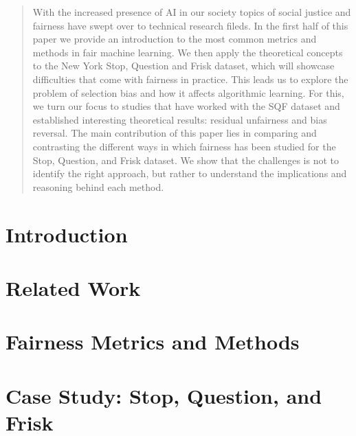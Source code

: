 \documentclass[12pt]{article}
\begin{document}
\newpage
\begin{abstract}

With the increased presence of AI in our society topics of social justice and fairness have swept over to technical research fileds. In the first half of this paper we provide an introduction to the most common metrics and methods in fair machine learning. We then apply the theoretical concepts to the New York Stop, Question and Frisk dataset, which will showcase difficulties that come with fairness in practice.
This leads us to explore the problem of selection bias and how it affects algorithmic learning. For this, we turn our focus to studies that have worked with the SQF dataset and established interesting theoretical results: residual unfairness and bias reversal.
The main contribution of this paper lies in comparing and contrasting the different ways in which fairness has been studied for the Stop, Question, and Frisk dataset. We show that the challenges is not to identify the right approach, but rather to understand the implications and reasoning behind each method.

\end{abstract}


\newpage
\tableofcontents
\newpage



    
\section{Introduction}

\newpage
\section{Related Work}

\newpage
\section{Fairness Metrics and Methods}
\label{sec:fairness_metrics_methods}


\newpage
\section{Case Study: Stop, Question, and Frisk}
\label{sec:case_study}

\newpage
\end{document}
